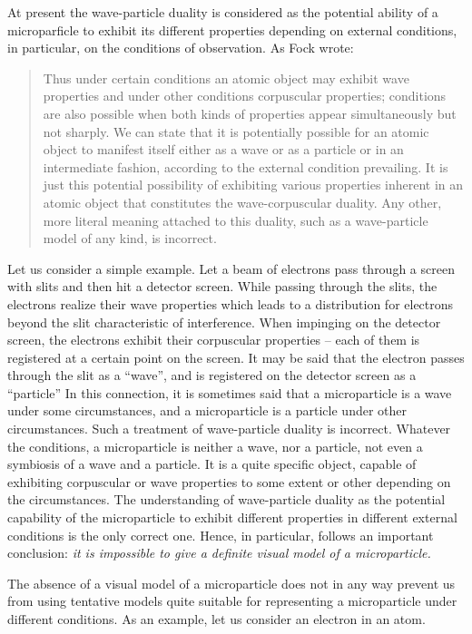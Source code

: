 \documentclass[a4paper,sfsidenotes,colorlinks=true]{tufte-book}
\numberwithin{equation}{section}
\numberwithin{figure}{section}
\begin{document}
At present the
wave-particle duality is considered as the potential ability of a
microparficle to exhibit its different properties depending on
external conditions, in particular, on the conditions of
observation. As Fock wrote: 
\begin{quote}
  Thus under certain conditions an atomic object may exhibit wave
  properties and under other conditions corpuscular properties;
  conditions are also possible when both kinds of properties appear
  simultaneously but not sharply. We can state that it is potentially
  possible for an atomic object to manifest itself either as a wave or
  as a particle or in an intermediate fashion, according to the
  external condition prevailing. It is just this potential possibility
  of exhibiting various properties inherent in an atomic object that
  constitutes the wave-corpuscular duality. Any other, more literal
  meaning attached to this duality, such as a wave-particle model of
  any kind, is incorrect.\cite{fock-1957}  
\end{quote}

Let us consider a simple example. Let a beam of electrons pass through
a screen with slits and then hit a detector screen. While passing
through the slits, the electrons realize their wave properties which
leads to a distribution for electrons beyond the slit characteristic
of interference. When impinging on the detector screen, the electrons
exhibit their corpuscular properties -- each of them is registered at
a certain point on the screen. It may be said that the electron passes
through the slit as a ``wave'', and is registered on the detector
screen as a ``particle'' In this connection, it is sometimes said that
a microparticle is a wave under some circumstances, and a
microparticle is a particle under other circumstances. Such a
treatment of wave-particle duality is incorrect. Whatever the
conditions, a microparticle is neither a wave, nor a particle, not
even a symbiosis of a wave and a particle. It is a quite specific
object, capable of exhibiting corpuscular or wave properties to some
extent or other depending on the circumstances. The understanding of
wave-particle duality as the potential capability of the microparticle
to exhibit different properties in different external conditions is
the only correct one. Hence, in particular, follows an important
conclusion: \emph{it is impossible to give a definite visual model of a
microparticle.}

The absence  of a visual model of a
microparticle does not in any way prevent us from using tentative
models quite suitable for representing a microparticle under different
conditions. As an example, let us consider an electron in an atom.
\end{document}

